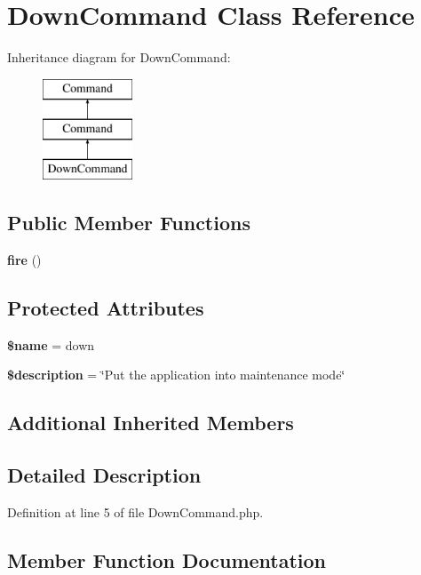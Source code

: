 \section{Down\+Command Class Reference}
\label{class_illuminate_1_1_foundation_1_1_console_1_1_down_command}
Inheritance diagram for Down\+Command\+:\begin{figure}[H]
\begin{center}
\leavevmode
\includegraphics[height=3.000000cm]{class_illuminate_1_1_foundation_1_1_console_1_1_down_command}
\end{center}
\end{figure}
\subsection*{Public Member Functions}
\begin{DoxyCompactItemize}
\item 
{\bf fire} ()
\end{DoxyCompactItemize}
\subsection*{Protected Attributes}
\begin{DoxyCompactItemize}
\item 
{\bf \$name} = \textquotesingle{}down\textquotesingle{}
\item 
{\bf \$description} = \char`\"{}Put the application into maintenance mode\char`\"{}
\end{DoxyCompactItemize}
\subsection*{Additional Inherited Members}


\subsection{Detailed Description}


Definition at line 5 of file Down\+Command.\+php.



\subsection{Member Function Documentation}
